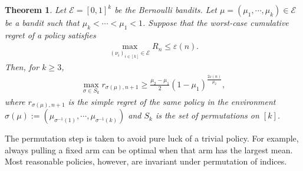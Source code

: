 \documentclass[10pt,a4article]{article}
\numberwithin{equation}{section}
\theoremstyle{plain}
\newtheorem{Th}{Theorem}[section]
\theoremstyle{definition}
\def\e{{\varepsilon}}
\begin{document}
\begin{Th}\label{bb:LB}
Let $\mathcal E=[0,1]^k$ be the Bernoulli bandits. Let $\mu = (\mu_1, \cdots, \mu_k)\in\mathcal E$ be a bandit such that $\mu_k<\cdots<\mu_1<1$. Suppose that the worst-case cumulative regret of a policy satisfies 
\begin{align}
\max_{(\nu_i)_{i\in [k]}\in\mathcal E}R_n\leq\e(n). \label{bb:1}
\end{align}
Then, for $k\geq 3$,
\begin{align*}
\max_{\sigma\in S_k}r_{\sigma(\mu), n+1}\geq\frac{\mu_2-\mu_1}{2}(1-\mu_1)^{\frac{2\e(n)}{\mu_2}},
\end{align*}
where $r_{\sigma(\mu), n+1}$ is the simple regret of the same policy in the environment $\sigma(\mu):=(\mu_{\sigma^{-1}(1)}, \cdots, \mu_{\sigma^{-1}(k)})$ and $S_k$ is the set of permutations on $[k]$.  
\end{Th}
The permutation step is taken to avoid pure luck of a trivial policy. For example, always pulling a fixed arm can be optimal when that arm has the largest mean. Most reasonable policies, however, are invariant under permutation of indices. 
\end{document}
